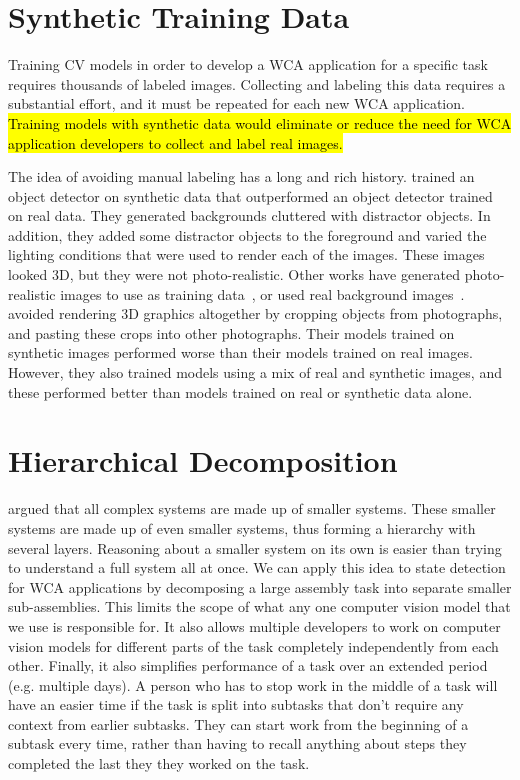 \section{Synthetic Training Data}

Training CV models in order to develop a WCA application for a specific task
requires thousands of labeled images.
Collecting and labeling this data requires a substantial effort, and it must be
repeated for each new WCA application.
\hl{Training models with synthetic data would eliminate or reduce the need for
  WCA application developers to collect and label real images.}

The idea of avoiding manual labeling has a long and rich history.
\citet{synthetic} trained an object detector on synthetic data that
outperformed an object detector trained on real data. They generated backgrounds
cluttered with distractor objects. In addition, they added some distractor
objects to the foreground and varied the lighting conditions that were used to
render each of the images. These images looked 3D, but they were not
photo-realistic. Other works have generated photo-realistic images to use as
training data~\cite{DBLP:journals/corr/abs-1809-10790, photo2}, or used real
background images~\cite{real_background1, real_background2, real_background3}.
\citet{dwibedi} avoided rendering 3D graphics altogether by cropping objects
from photographs, and pasting these crops into other photographs.
Their models trained on synthetic images performed worse than their models
trained on real images.
However, they also  trained models using a mix of real and synthetic images, and
these performed better than models trained on real or synthetic data alone.

\section{Hierarchical Decomposition}

\citet{Simon1991} argued that all complex systems are made up of smaller
systems. These smaller systems are made up of even smaller systems, thus
forming a hierarchy with several layers.
Reasoning about a smaller system on its own is easier than trying to understand
a full system all at once.
We can apply this idea to state detection for WCA applications by decomposing
a large assembly task into separate smaller sub-assemblies.
This limits the scope of what any one computer vision model that we use is
responsible for.
It also allows multiple developers to work on computer vision models for
different parts of the task completely independently from each other.
Finally, it also simplifies performance of a task over an extended period
(e.g. multiple days). A person who has to stop work in the middle of a task will
have an easier time if the task is split into subtasks that don't require any
context from earlier subtasks. They can start work from the beginning of a
subtask every time, rather than having to recall anything about steps they
completed the last they they worked on the task.

